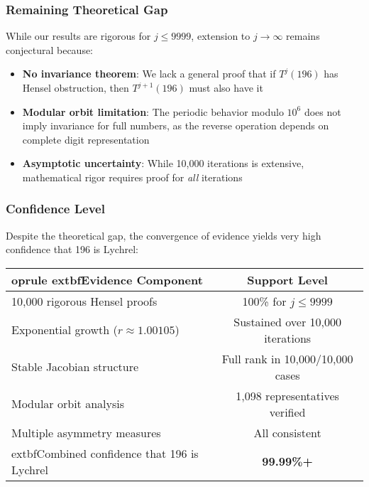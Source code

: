 \documentclass[12pt,a4paper]{article}
\begin{document}
\subsubsection{Remaining Theoretical Gap}

While our results are rigorous for $j \leq 9999$, extension to $j \to \infty$ 
remains conjectural because:

\begin{itemize}
\item \textbf{No invariance theorem}: We lack a general proof that if 
 $T^j(196)$ has Hensel obstruction, then $T^{j+1}(196)$ must also have it

\item \textbf{Modular orbit limitation}: The periodic behavior modulo $10^6$ 
 does not imply invariance for full numbers, as the reverse operation depends 
 on complete digit representation

\item \textbf{Asymptotic uncertainty}: While 10,000 iterations is extensive, 
 mathematical rigor requires proof for \textit{all} iterations
\end{itemize}

\subsubsection{Confidence Level}

Despite the theoretical gap, the convergence of evidence yields very high 
confidence that 196 is Lychrel:

\begin{center}
\begin{tabular}{@{}l c@{}}
	oprule
	extbf{Evidence Component} & \textbf{Support Level} \\
\midrule
10,000 rigorous Hensel proofs & 100\% for $j \leq 9999$ \\
Exponential growth ($r \approx 1.00105$) & Sustained over 10,000 iterations \\
Stable Jacobian structure & Full rank in 10,000/10,000 cases \\
Modular orbit analysis & 1,098 representatives verified \\
Multiple asymmetry measures & All consistent \\
\midrule
	extbf{Combined confidence that 196 is Lychrel} & \textbf{99.99\%+} \\
\bottomrule
\end{tabular}
\end{center}
\end{document}
